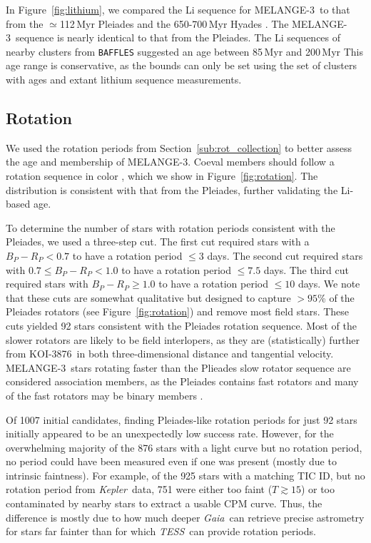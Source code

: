 \documentclass[twocolumn, linenumbers]{aastex631}
\newcommand{\association}{MELANGE-3}
\newcommand{\starname}{KOI-3876}
\newcommand{\kepler}{{\it Kepler}}
\newcommand{\tess}{\textit{TESS}}
\newcommand{\gaia}{\textit{Gaia}}
\begin{document}
In Figure~\ref{fig:lithium}, we compared the Li sequence for \association\ to that from the $\simeq$112\,Myr Pleiades \citep{2018A&A...613A..63B} and the 650-700\,Myr Hyades \citep{2017AJ....153..128C}. The \association\ sequence is nearly identical to that from the Pleiades. The Li sequences of nearby clusters from \texttt{BAFFLES} \citep{BAFFLES2020} suggested an age between 85\,Myr and 200\,Myr This age range is conservative, as the bounds can only be set using the set of clusters with ages and extant lithium sequence measurements. %


\subsection{Rotation}\label{sec:rotation}
We used the rotation periods from Section~\ref{sub:rot_collection} to better assess the age and membership of \association. Coeval members should follow a rotation sequence in color \citep[a gyrochrone;][]{Barnes2003, 2007ApJ...669.1167B}, which we show in Figure~\ref{fig:rotation}. The distribution is consistent with that from the Pleiades, further validating the Li-based age. 

To determine the number of stars with rotation periods consistent with the Pleiades, we used a three-step cut. The first cut required stars with a $B_P-R_P<0.7$ to have a rotation period $\leq3$ days. The second cut required stars with $0.7\leq B_P-R_P<1.0$ to have a rotation period $\leq7.5$ days. The third cut required stars with $B_P-R_P\geq1.0$ to have a rotation period $\leq10$ days. We note that these cuts are somewhat qualitative but designed to capture $>95$\% of the Pleiades rotators (see Figure~\ref{fig:rotation}) and remove most field stars. These cuts yielded 92 stars consistent with the Pleiades rotation sequence.  Most of the slower rotators are likely to be field interlopers, as they are (statistically) further from \starname\ in both three-dimensional distance and tangential velocity. \association\ stars rotating faster than the Plieades slow rotator sequence are considered association members, as the Pleiades contains fast rotators and many of the fast rotators may be binary members \citep{2016AJ....152..114R,Douglas:2019}.



Of 1007 initial candidates, finding Pleiades-like rotation periods for just 92 stars initially appeared to be an unexpectedly low success rate. However, for the overwhelming majority of the 876 stars with a light curve but no rotation period, no period could have been measured even if one was present (mostly due to intrinsic faintness). For example, of the 925 stars with a matching TIC ID, but no rotation period from \kepler\ data, 751 were either too faint ($T\gtrsim15$) or too contaminated by nearby stars to extract a usable CPM curve. Thus, the difference is mostly due to how much deeper \gaia\ can retrieve precise astrometry for stars far fainter than for which \tess\ can provide rotation periods. 
\end{document}
